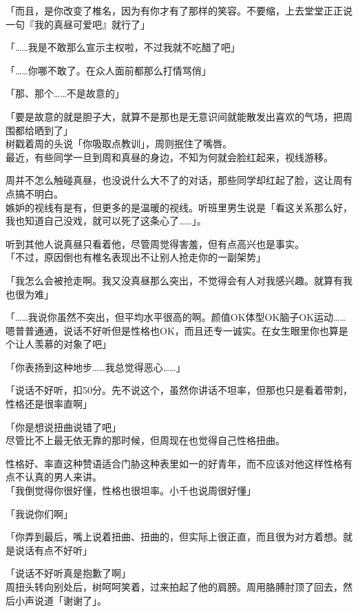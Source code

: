 「而且，是你改变了椎名，因为有你才有了那样的笑容。不要缩，上去堂堂正正说一句『我的真昼可爱吧』就行了」

「……我是不敢那么宣示主权啦，不过我就不吃醋了吧」

「……你哪不敢了。在众人面前都那么打情骂俏」

「那、那个……不是故意的」

「要是故意的就是胆子大，就算不是那也是无意识间就能散发出喜欢的气场，把周围都给晒到了」\\

树戳着周的头说「你吸取点教训」，周则抿住了嘴唇。\\

最近，有些同学一旦到周和真昼的身边，不知为何就会脸红起来，视线游移。

周并不怎么触碰真昼，也没说什么大不了的对话，那些同学却红起了脸，这让周有点搞不明白。\\

嫉妒的视线有是有，但更多的是温暖的视线。听班里男生说是「看这关系那么好，我也知道自己没戏，就可以死了这条心了……」。

听到其他人说真昼只看着他，尽管周觉得害羞，但有点高兴也是事实。\\

「不过，原因倒也有椎名表现出不让别人抢走你的一副架势」

「我怎么会被抢走啊。我又没真昼那么突出，不觉得会有人对我感兴趣。就算有我也很为难」

「……我说你虽然不突出，但平均水平很高的啊。颜值OK体型OK脑子OK运动……嗯普普通通，说话不好听但是性格也OK，而且还专一诚实。在女生眼里你也算是个让人羡慕的对象了吧」

「你表扬到这种地步……我总觉得恶心……」

「说话不好听，扣50分。先不说这个，虽然你讲话不坦率，但那也只是看着带刺，性格还是很率直啊」

「你是想说扭曲说错了吧」\\

尽管比不上最无依无靠的那时候，但周现在也觉得自己性格扭曲。

性格好、率直这种赞语适合门胁这种表里如一的好青年，而不应该对他这样性格有点不认真的男人来讲。\\

「我倒觉得你很好懂，性格也很坦率。小千也说周很好懂」

「我说你们啊」

「你弄到最后，嘴上说着扭曲、扭曲的，但实际上很正直，而且很为对方着想。就是说话有点不好听」

「说话不好听真是抱歉了啊」\\

周扭头转向别处后，树呵呵笑着，过来拍起了他的肩膀。周用胳膊肘顶了回去，然后小声说道「谢谢了」。

